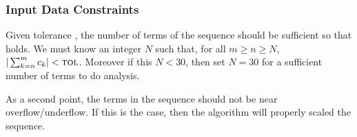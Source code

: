 \documentclass[12pt]{article}
\begin{document}


\subsubsection{Input Data Constraints} \label{sec_DataConstraints}    

Given tolerance \tol, the number of terms of the sequence should be sufficient so that 
  holds. We must know an integer $N$ such that, for all $m \geq n \geq N$,
  $| \sum_{k=n}^{m} c_k | < \text{\sc tol}$. Moreover if this $N<30$, then set $N=30$ for a sufficient
  number of terms to do analysis.

As a second point, the terms in the sequence should not be near overflow/underflow. If this
is the case, then the algorithm will properly scaled the sequence.
\end{document}
